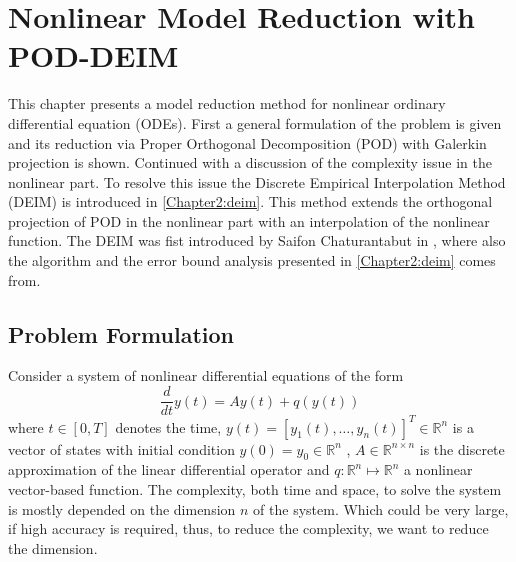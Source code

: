
\chapter{Nonlinear Model Reduction with POD-DEIM} %

\label{Chapter2} %

This chapter presents a model reduction method for nonlinear ordinary differential equation
(ODEs). First a general formulation of the problem is given and its reduction via Proper Orthogonal Decomposition
(POD) with Galerkin projection is shown. Continued with a discussion of the complexity issue in the nonlinear part.
To resolve this issue the Discrete Empirical Interpolation Method (DEIM) is introduced in \ref{Chapter2:deim}.
This method extends the orthogonal projection of POD in the nonlinear part with an interpolation of the nonlinear function.
The DEIM was fist introduced by Saifon Chaturantabut in \cite{Chaturantabut2010Deim}, where also the algorithm
and the error bound analysis presented in \ref{Chapter2:deim} comes from.

\section{Problem Formulation}
\label{Chapter2:problem}
Consider a system of nonlinear differential equations of the form
\begin{equation}
\label{problem:ODE}
 \frac{d}{dt}y(t) = Ay(t) + q(y(t))
\end{equation}
where $t \in [0,T]$ denotes the time, $y(t) = [y_1(t),\dots,y_n(t)]^T \in \mathbb{R}^n$ is a vector of states with
initial condition $y(0) = y_0 \in \mathbb{R}^n$ , $A \in \mathbb{R}^{n \times n}$ is the discrete approximation of the 
linear differential operator and $q:\mathbb{R}^n \longmapsto \mathbb{R}^n$ a nonlinear vector-based function.
The complexity, both time and space, to solve the system is mostly depended on the dimension $n$ of the system. Which could be very large, if
high accuracy is required, thus, to reduce the complexity, we want to reduce the dimension.

